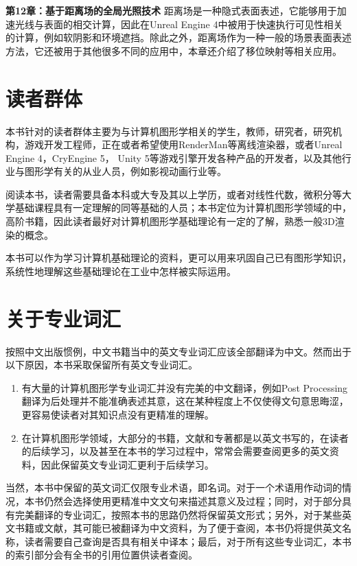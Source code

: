 \textbf{第12章：基于距离场的全局光照技术 } 距离场是一种隐式表面表述，它能够用于加速光线与表面的相交计算，因此在Unreal Engine 4中被用于快速执行可见性相关的计算，例如软阴影和环境遮挡。除此之外，距离场作为一种一般的场景表面表述方法，它还被用于其他很多不同的应用中，本章还介绍了移位映射等相关应用。



\section*{读者群体}
本书针对的读者群体主要为与计算机图形学相关的学生，教师，研究者，研究机构，游戏开发工程师，正在或者希望使用RenderMan等离线渲染器，或者Unreal Engine 4，CryEngine 5， Unity 5等游戏引擎开发各种产品的开发者，以及其他行业与图形学有关的从业人员，例如影视动画行业等。

阅读本书，读者需要具备本科或大专及其以上学历，或者对线性代数，微积分等大学基础课程具有一定理解的同等基础的人员；本书定位为计算机图形学领域的中，高阶书籍，因此读者最好对计算机图形学基础理论有一定的了解，熟悉一般3D渲染的概念。

本书可以作为学习计算机基础理论的资料，更可以用来巩固自己已有图形学知识，系统性地理解这些基础理论在工业中怎样被实际运用。



\section*{关于专业词汇}
按照中文出版惯例，中文书籍当中的英文专业词汇应该全部翻译为中文。然而出于以下原因，本书采取保留所有英文专业词汇。

\begin{enumerate}
	\item 有大量的计算机图形学专业词汇并没有完美的中文翻译，例如Post Processing翻译为后处理并不能准确表述其意，这在某种程度上不仅使得文句意思晦涩，更容易使读者对其知识点没有更精准的理解。
	\item 在计算机图形学领域，大部分的书籍，文献和专著都是以英文书写的，在读者的后续学习，以及甚至在本书的学习过程中，常常会需要查阅更多的英文资料，因此保留英文专业词汇更利于后续学习。
\end{enumerate}

当然，本书中保留的英文词汇仅限专业术语，即名词。对于一个术语用作动词的情况，本书仍然会选择使用更精准中文文句来描述其意义及过程；同时，对于部分具有完美翻译的专业词汇，按照本书的思路仍然将保留英文形式；另外，对于某些英文书籍或文献，其可能已被翻译为中文资料，为了便于查阅，本书仍将提供英文名称，读者需要自己查询是否具有相关中译本；最后，对于所有这些专业词汇，本书的索引部分会有全书的引用位置供读者查阅。



